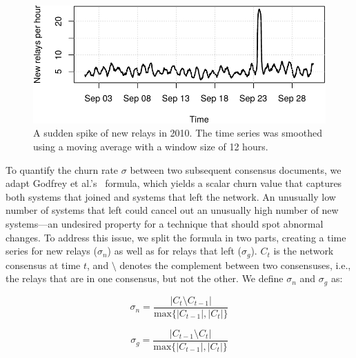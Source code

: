 \begin{figure}[t]
	\centering
	\includegraphics[width=\linewidth]{diagrams/sudden-spike.pdf}
	\caption{A sudden spike of new relays in 2010.  The time series was smoothed
	using a moving average with a window size of 12 hours.}
	\label{fig:sudden-spike}
\end{figure}

To quantify the churn rate $\sigma$ between two subsequent consensus documents,
we adapt Godfrey et al.'s~\cite{Godfrey2006a} formula, which yields a scalar
churn value that captures both systems that joined and systems that left the
network.  An unusually low number of systems that left could cancel out an
unusually high number of new systems---an undesired property for a technique
that should spot abnormal changes.  To address this issue, we split the formula
in two parts, creating a time series for new relays ($\sigma_{n}$) as well as
for relays that left ($\sigma_{g}$).  $C_{t}$ is the network consensus at time
$t$, and $\setminus$ denotes the complement between two consensuses, i.e., the
relays that are in one consensus, but not the other.  We define $\sigma_{n}$ and
$\sigma_{g}$ as:


\begin{equation}
\sigma_{n} = \frac{\lvert C_{t} \setminus C_{t-1} \rvert}
{\textrm{max}\{\lvert C_{t-1} \rvert, \lvert C_{t} \rvert \}}
\end{equation}

\begin{equation}
\sigma_{g} = \frac{\lvert C_{t-1} \setminus C_{t} \rvert}
{\textrm{max}\{\lvert C_{t-1} \rvert, \lvert C_{t} \rvert \}}
\end{equation}

